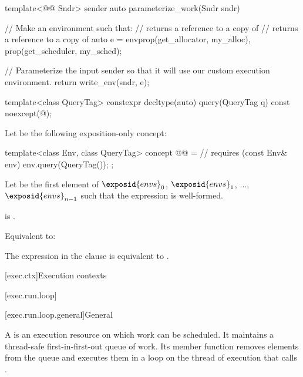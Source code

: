 \pnum
\begin{example}
\begin{codeblock}
template<@@ Sndr>
sender auto parameterize_work(Sndr sndr) {
  // Make an environment such that:
  //    returns a reference to a copy of 
  //    returns a reference to a copy of 
  auto e = env{prop(get_allocator, my_alloc{}),
               prop(get_scheduler, my_sched{})};

  // Parameterize the input sender so that it will use our custom execution environment.
  return write_env(sndr, e);
}
\end{codeblock}
\end{example}

%
\begin{itemdecl}
template<class QueryTag>
constexpr decltype(auto) query(QueryTag q) const noexcept(@\seebelow@);
\end{itemdecl}

\begin{itemdescr}
\pnum
Let  be the following exposition-only concept:
\begin{codeblock}
template<class Env, class QueryTag>
  concept @@ =                   // \expos
    requires (const Env& env) {
      env.query(QueryTag());
    };
\end{codeblock}

\pnum
Let  be the first element of
$\exposid{envs}_0$, $\exposid{envs}_1$, $\dotsc$, $\exposid{envs}_{n-1}$
such that the expression  is well-formed.

\pnum
\constraints
{} is .

\pnum
\effects
Equivalent to: 

\pnum
\remarks
The expression in the  clause is equivalent
to .
\end{itemdescr}

[exec.ctx]{Execution contexts}

[exec.run.loop]{}

[exec.run.loop.general]{General}

\pnum
A  is an execution resource on which work can be scheduled.
It maintains a thread-safe first-in-first-out queue of work.
Its  member function removes elements from the queue and
executes them in a loop on the thread of execution that calls .

